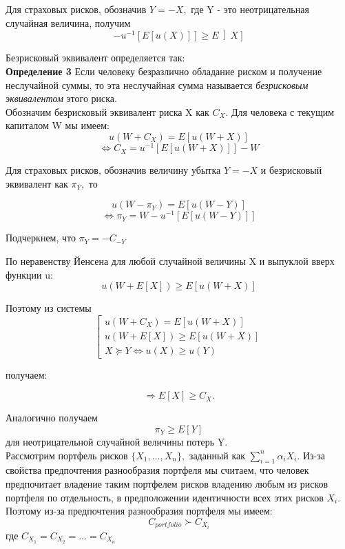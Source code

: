 \documentclass[12pt,a4paper]{article}
\begin{document}
Для страховых рисков, обозначив $Y=-X,$ где Y - это неотрицательная случайная величина, получим 
$$ - u^{-1}  \left[ E \left[ u(X) \right] \right]   \geq  E  \left]  X \right]  $$

Безрисковый эквивалент  определяется так:\\

{\bf Определение 3}  Если человеку безразлично обладание риском и получение неслучайной суммы, то эта неслучайная сумма называется { \itshape безрисковым эквивалентом } этого риска.\\

Обозначим безрисковый эквивалент риска X как $C_X.$ Для человека с текущим капиталом W мы имеем:
$$u(W + C_X) = E \left[   u(W + X)  \right]  $$
$$\Leftrightarrow C_X = u^{-1}  \left[  E \left[   u(W + X)  \right]  \right]  - W$$

Для страховых рисков, обозначив величину убытка $Y=-X$ и безрисковый эквивалент как $\pi_Y,$ то

$$ u(W  -  \pi_Y ) = E \left[   u(W - Y)  \right] $$
$$\Leftrightarrow  \pi_Y =  W- u^{-1}  \left[  E \left[   u(W - Y)  \right]  \right]  $$

Подчеркнем, что $  \pi_Y = - C_{-Y}$

По неравенству Йенсена для любой случайной величины X и выпуклой вверх функции u:
$$ u(W + E \left[ X \right] )  \geq  E \left[   u(W + X)  \right]  $$

Поэтому из системы 
$$\left[ \begin{array}{crl}
u(W + C_X) = E \left[   u(W + X)  \right] \\
u(W + E \left[ X \right] )  \geq  E \left[   u(W + X)  \right]\\
X \succeq Y \Leftrightarrow u(X) \geq  u(Y)
\end{array}\right. $$

получаем:

$$\Rightarrow  E \left[ X \right]   \geq  C_X.$$

Аналогично получаем  $$  \pi_Y \geq  E \left[ Y \right] $$ для неотрицательной случайной величины потерь Y.\\

Рассмотрим портфель рисков $ \{ X_1, \dots, X_n \} ,$ заданный как $\sum\limits_{i=1}^{n} \alpha_i X_i.$ Из-за свойства предпочтения разнообразия портфеля мы считаем, что человек предпочитает владение таким портфелем рисков владению любым из рисков портфеля по отдельность, в предположении идентичности всех этих рисков $X_i.$ Поэтому из-за предпочтения разнообразия портфеля мы имеем:
$$C_{portfolio} \succ C_{X_i}$$
где $C_{X_1}= C_{X_2} = \dots = C_{X_n}$\\
\end{document}
